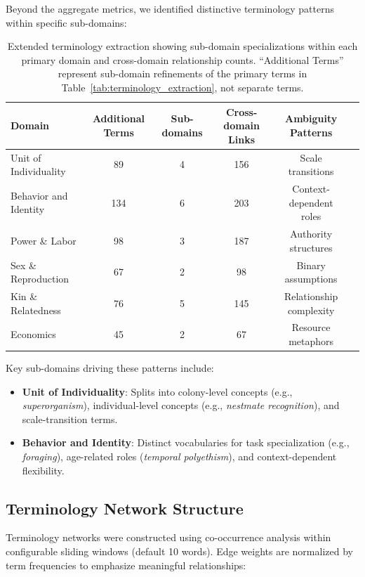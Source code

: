 \documentclass[
]{article}
\providecommand{\tightlist}{%
  \setlength{\itemsep}{0pt}\setlength{\parskip}{0pt}}
\numberwithin{equation}{section}
\begin{document}
Beyond the aggregate metrics, we identified distinctive terminology
patterns within specific sub-domains:

\begin{table}[h]
\centering
\begin{tabular}{|l|c|c|c|c|c|}
\hline
\textbf{Domain} & \textbf{Additional Terms} & \textbf{Sub-domains} & \textbf{Cross-domain Links} & \textbf{Ambiguity Patterns} \\
\hline
Unit of Individuality & 89 & 4 & 156 & Scale transitions \\
Behavior and Identity & 134 & 6 & 203 & Context-dependent roles \\
Power \& Labor & 98 & 3 & 187 & Authority structures \\
Sex \& Reproduction & 67 & 2 & 98 & Binary assumptions \\
Kin \& Relatedness & 76 & 5 & 145 & Relationship complexity \\
Economics & 45 & 2 & 67 & Resource metaphors \\
\hline
\end{tabular}
\caption{Extended terminology extraction showing sub-domain specializations within each primary domain and cross-domain relationship counts. ``Additional Terms'' represent sub-domain refinements of the primary terms in Table~\ref{tab:terminology_extraction}, not separate terms.}
\label{tab:extended_terminology}
\end{table}

Key sub-domains driving these patterns include:

\begin{itemize}
\tightlist
\item
  \textbf{Unit of Individuality}: Splits into colony-level concepts
  (e.g., \emph{superorganism}), individual-level concepts (e.g.,
  \emph{nestmate recognition}), and scale-transition terms.
\item
  \textbf{Behavior and Identity}: Distinct vocabularies for task
  specialization (e.g., \emph{foraging}), age-related roles
  (\emph{temporal polyethism}), and context-dependent flexibility.
\end{itemize}

\subsection{Terminology Network
Structure}\label{terminology-network-structure}

Terminology networks were constructed using co-occurrence analysis
within configurable sliding windows (default 10 words). Edge weights are
normalized by term frequencies to emphasize meaningful relationships:
\end{document}
